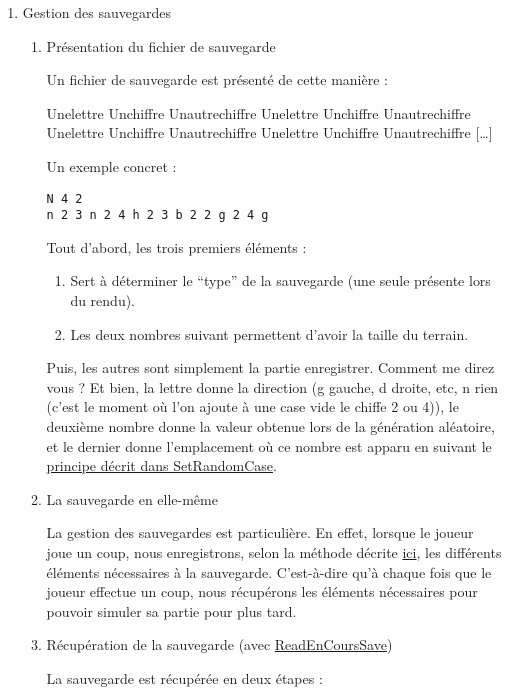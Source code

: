 \documentclass[letter]{article}
\begin{document}
\begin{enumerate}
\item Gestion des sauvegardes
\label{sec:org5756535}

\begin{enumerate}
\item Présentation du fichier de sauvegarde
\label{sec:org0f3ee4f}




Un fichier de sauvegarde est présenté de cette manière :

Unelettre Unchiffre Unautrechiffre
Unelettre Unchiffre Unautrechiffre Unelettre Unchiffre Unautrechiffre Unelettre Unchiffre Unautrechiffre [\ldots{}]

Un exemple concret :
\begin{verbatim}
N 4 2
n 2 3 n 2 4 h 2 3 b 2 2 g 2 4 g 
\end{verbatim}

Tout d'abord, les trois premiers éléments :
\begin{enumerate}
\item Sert à déterminer le “type” de la sauvegarde (une seule présente lors du rendu).
\item Les deux nombres suivant permettent d'avoir la taille du terrain.
\end{enumerate}

Puis, les autres sont simplement la partie enregistrer.
Comment me direz vous ?
Et bien, la lettre donne la direction (g gauche, d droite, etc, n rien (c'est le moment où l'on ajoute à une case vide le chiffe 2 ou 4)), le deuxième nombre donne la valeur obtenue lors de la génération aléatoire, et le dernier donne l'emplacement où ce nombre est apparu en suivant le \hyperref[sec:orgc1d752d]{principe décrit dans SetRandomCase}.


\item La sauvegarde en elle-même
\label{sec:org639dc9b}

La gestion des sauvegardes est particulière.
En effet, lorsque le joueur joue un coup, nous enregistrons, selon la méthode décrite \hyperref[sec:org0f3ee4f]{ici}, les différents éléments nécessaires à la sauvegarde.
C'est-à-dire qu'à chaque fois que le joueur effectue un coup, nous récupérons les éléments nécessaires pour pouvoir simuler sa partie pour plus tard.

\item Récupération de la sauvegarde (avec \hyperref[sec:org1b2decf]{ReadEnCoursSave})
\label{sec:org86f4453}

La sauvegarde est récupérée en deux étapes :


\end{enumerate}
\end{enumerate}
\end{document}
